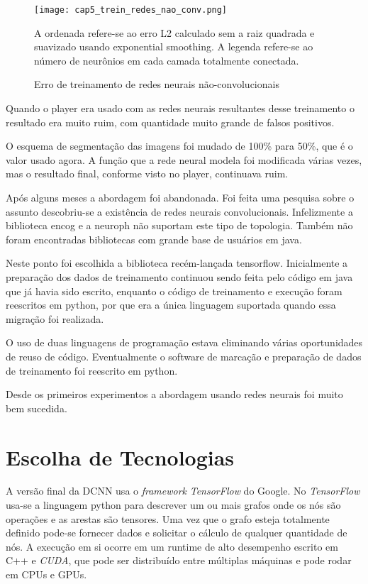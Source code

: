 \begin{figure}[!htb]
	\centering
	\texttt{[image: cap5\_trein\_redes\_nao\_conv.png]}
	\caption{Erro de treinamento de redes neurais não-convolucionais}
	\label{fig:cap5_trein_redes_nao_conv}
	A ordenada refere-se ao erro L2 calculado sem a raiz quadrada e suavizado
	usando exponential smoothing. A legenda refere-se ao número de neurônios
	em cada camada totalmente conectada.
\end{figure}


Quando o player era usado com as redes neurais resultantes desse treinamento o
resultado era muito ruim, com quantidade muito grande de falsos positivos.

O esquema de segmentação das imagens foi mudado de 100\% para 50\%, que é o
valor usado agora. A função que a rede neural modela foi modificada
várias vezes, mas
o resultado final, conforme visto no player, continuava ruim.

Após alguns meses a abordagem foi abandonada. Foi feita uma pesquisa sobre o
assunto descobriu-se a existência de redes neurais convolucionais. Infelizmente
a biblioteca encog e a neuroph não suportam este tipo de topologia. Também não
foram encontradas bibliotecas com grande base de usuários em java.

Neste ponto foi escolhida a biblioteca recém-lançada tensorflow. Inicialmente a
preparação dos dados de treinamento continuou sendo feita pelo código em java
que já havia sido escrito, enquanto o código de treinamento e execução foram
reescritos em python, por que era a única linguagem suportada quando essa
migração foi realizada.

O uso de duas linguagens de programação estava eliminando várias oportunidades
de reuso de código. Eventualmente o software de marcação e preparação de dados
de treinamento foi reescrito em python.

Desde os primeiros experimentos a abordagem usando redes neurais foi muito bem
sucedida.

\section{Escolha de Tecnologias}
A versão final da DCNN usa o \emph{framework} \emph{TensorFlow} do Google.
No \emph{TensorFlow} usa-se a linguagem python para descrever um ou mais
grafos onde
os nós são operações e as arestas são tensores. Uma vez que o grafo esteja
totalmente definido pode-se fornecer dados e solicitar o cálculo de qualquer
quantidade de nós. A execução em si ocorre em um runtime de alto desempenho
escrito em C++ e \emph{CUDA}, que pode ser distribuído entre múltiplas
máquinas e pode rodar em CPUs e GPUs.


